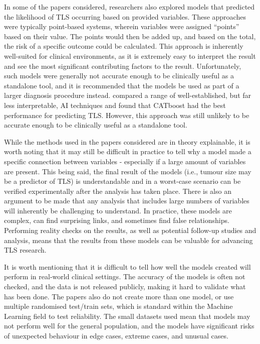 \documentclass{article}
\begin{document}
In some of the papers considered, researchers also explored models that predicted the likelihood of TLS occurring based on provided variables. These approaches were typically point-based systems, wherein variables were assigned “points” based on their value. The points would then be added up, and based on the total, the risk of a specific outcome could be calculated. This approach is inherently well-suited for clinical environments, as it is extremely easy to interpret the result and see the most significant contributing factors to the result. Unfortunately, such models were generally not accurate enough to be clinically useful as a standalone tool, and it is recommended that the models be used as part of a larger diagnosis procedure instead. \cite{xiao2024prediction}  compared a range of well-established, but far less interpretable, AI techniques and found that CATboost had the best performance for predicting TLS. However, this approach was still unlikely to be accurate enough to be clinically useful as a standalone tool.

While the methods used in the papers considered are in theory explainable, it is worth noting that it may still be difficult in practice to tell why a model made a specific connection between variables - especially if a large amount of variables are present. This being said, the final result of the models (i.e., tumour size may be a predictor of TLS) is understandable and in a worst-case scenario can be verified experimentally after the analysis has taken place. There is also an argument to be made that any analysis that includes large numbers of variables will inherently be challenging to understand. In practice, these models are complex, can find surprising links, and sometimes find false relationships. Performing reality checks on the results, as well as potential follow-up studies and analysis, means that the results from these models can be valuable for advancing TLS research.

It is worth mentioning that it is difficult to tell how well the models created will perform in real-world clinical settings. The accuracy of the models is often not checked, and the data is not released publicly, making it hard to validate what has been done. The papers also do not create more than one model, or use multiple randomised test/train sets, which is standard within the Machine Learning field to test reliability. The small datasets used mean that models may not perform well for the general population, and the models have significant risks of unexpected behaviour in edge cases, extreme cases, and unusual cases.
\end{document}
